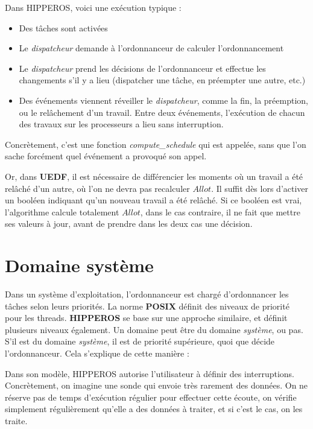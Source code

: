 		Dans HIPPEROS, voici une exécution typique :
		\begin{itemize}
			\setlength\itemsep{0.1em}
			\item Des tâches sont activées
			\item Le \textit{dispatcheur} demande à l'ordonnanceur de calculer l'ordonnancement
			\item Le \textit{dispatcheur} prend les décisions de l'ordonnanceur et effectue les changements 
			s'il y a lieu (dispatcher une tâche, en préempter une autre, etc.)
			\item Des événements viennent réveiller le \textit{dispatcheur}, comme la fin, 
			la préemption, ou le relâchement d'un travail. Entre deux événements, l'exécution 
			de chacun des travaux sur les processeurs a lieu sans interruption.
		\end{itemize}
		
		Concrètement, c'est une fonction \textit{compute\_schedule} qui est appelée, sans 
		que l'on sache forcément quel événement a provoqué son appel. \newline
		
		Or, dans \textbf{UEDF}, il est nécessaire de différencier les moments où un travail a été relâché 
		d'un autre, où l'on ne devra pas recalculer $Allot$. Il suffit dès lors d'activer un 
		booléen indiquant qu'un nouveau travail a été relâché. Si ce booléen est vrai, 
		l'algorithme calcule totalement $Allot$, dans le cas contraire, il ne fait que mettre ses valeurs à 
		jour, avant de prendre dans les deux cas une décision.\newline
	
	\section{Domaine système}
	Dans un système d'exploitation, l'ordonnanceur est chargé d'ordonnancer les tâches selon leurs priorités. 
	La norme \textbf{POSIX} définit des niveaux de priorité pour les threads. 
	\textbf{HIPPEROS} se base sur une approche similaire, et définit plusieurs niveaux également. 
	Un domaine peut être du domaine
	\textit{système}, ou pas. S'il est du domaine \textit{système}, il est de priorité supérieure, quoi que décide 
	l'ordonnanceur. Cela s'explique de cette manière :\newline

	Dans son modèle, HIPPEROS autorise l'utilisateur à définir des interruptions. 	
	Concrètement, on imagine une sonde qui envoie très rarement des données. On ne réserve 
	pas de temps d'exécution régulier pour effectuer cette écoute, 
	on vérifie simplement régulièrement qu'elle a des données à traiter, et si c'est le cas, on les traite.\newline
	
